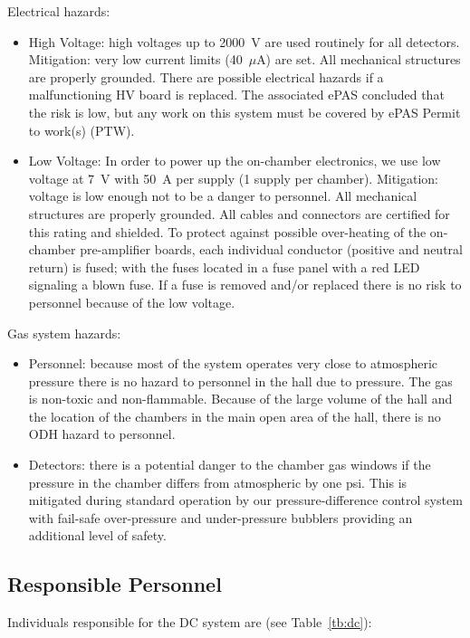 Electrical hazards:
\begin{itemize}
\item High Voltage: high voltages up to 2000~V are used routinely for all detectors. Mitigation: 
very low current limits (40~$\mu$A) are set. All mechanical structures are properly grounded.  
There are possible electrical hazards if a malfunctioning HV board is replaced. The associated
ePAS concluded that the risk is low, but any work on this system must be covered by ePAS Permit
to work(s) (PTW).

\item Low Voltage: In order to power up the on-chamber electronics, we use low voltage at 7~V 
with 50~A per supply (1 supply per chamber). Mitigation: voltage is low enough not to be a 
danger to personnel. All mechanical structures are properly grounded. All cables and connectors 
are certified for this rating and shielded. To protect against possible over-heating of the 
on-chamber pre-amplifier boards, each individual conductor (positive and neutral return) is 
fused; with the fuses located in a fuse panel with a red LED signaling a blown fuse. If a 
fuse is removed and/or replaced there is no risk to personnel because of the low voltage.

\end{itemize}

Gas system hazards:
\begin{itemize}
\item Personnel: because most of the system operates very close to atmospheric pressure there 
is no hazard to personnel in the hall due to pressure. The gas is non-toxic and non-flammable.  
Because of the large volume of the hall and the location of the chambers in the main open area 
of the hall, there is no ODH hazard to personnel.
\item Detectors: there is a potential danger to the chamber gas windows if the pressure in the 
chamber differs from atmospheric by one psi. This is mitigated during standard operation by our 
pressure-difference control system with fail-safe over-pressure and under-pressure bubblers 
providing an additional level of safety.
\end{itemize}

\subsection{Responsible Personnel}

Individuals responsible for the DC system are (see Table~\ref{tb:dc}):

